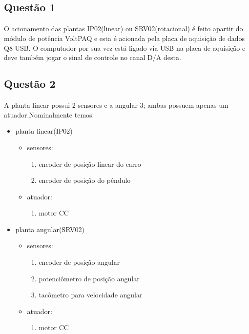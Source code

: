 \documentclass[a4paper,11pt]{article}
\begin{document}
\subsection{Questão 1}
	\paragraph{} O acionamento das plantas IP02(linear) ou SRV02(rotacional) é feito apartir do módulo 
	de potência VoltPAQ e esta
	é acionada pela placa de aquisição de dados Q8-USB. O computador por sua vez está ligado via USB na 
	placa de aquisição e deve também jogar o sinal de controle no canal D/A desta.
	
\subsection{Questão 2} 
	\paragraph{}A planta linear possui 2 sensores e a angular 3; ambas possuem apenas um atuador.Nominalmente temos:
	\begin{itemize}
		\item planta linear(IP02)
			\begin{itemize}
				\item sensores:
					\begin{enumerate}
					\item encoder de posição linear do carro
					\item encoder de posição do pêndulo
					\end{enumerate}
				\item atuador:
					\begin{enumerate}
						\item motor CC
					\end{enumerate}
			\end{itemize}

		\item planta angular(SRV02)
			\begin{itemize}
				\item sensores:
					\begin{enumerate}
					\item encoder de posição angular
					\item potenciômetro de posição angular
					\item tacômetro para velocidade angular
					\end{enumerate}
				\item atuador:
					\begin{enumerate}
						\item motor CC
					\end{enumerate}
			\end{itemize}

			
	\end{itemize}
\end{document}
